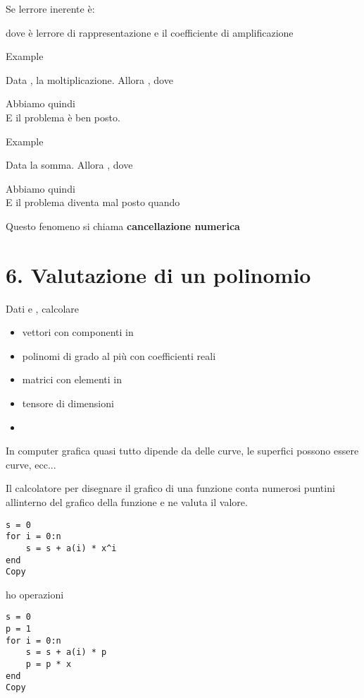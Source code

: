 \documentclass[
]{article}
\providecommand{\tightlist}{%
  \setlength{\itemsep}{0pt}\setlength{\parskip}{0pt}}
\begin{document}
{}{}Se {} l\textquotesingle errore inerente è:

dove {} è l\textquotesingle errore di rappresentazione e {} il
coefficiente di amplificazione

Example

Data {}, la moltiplicazione. Allora {}, dove

{}

Abbiamo quindi\\
{}E il problema è ben posto.

Example

Data {} la somma. Allora {}, dove\\
{}

Abbiamo quindi\\
{}E il problema diventa mal posto quando {}

Questo fenomeno si chiama \textbf{cancellazione numerica}\\
{}

\hypertarget{valutazione-di-un-polinomio}{%
\section{6. Valutazione di un
polinomio}\label{valutazione-di-un-polinomio}}

Dati {} e {}, calcolare {}

\begin{itemize}
\tightlist
\item
  {} vettori con {} componenti in {}
\item
  {} polinomi di grado al più {} con coefficienti reali
\item
  {} matrici {} con elementi in {}
\item
  {} tensore di {} dimensioni
\item
  {}
\end{itemize}

In computer grafica quasi tutto dipende da delle curve, le superfici
possono essere curve, ecc...

Il calcolatore per disegnare il grafico di una funzione conta numerosi
puntini all\textquotesingle interno del grafico della funzione e ne
valuta il valore.

{}

\begin{verbatim}
s = 0
for i = 0:n
    s = s + a(i) * x^i
end
Copy
\end{verbatim}

ho {} operazioni

\begin{verbatim}
s = 0
p = 1
for i = 0:n
    s = s + a(i) * p
    p = p * x
end
Copy
\end{verbatim}
\end{document}
